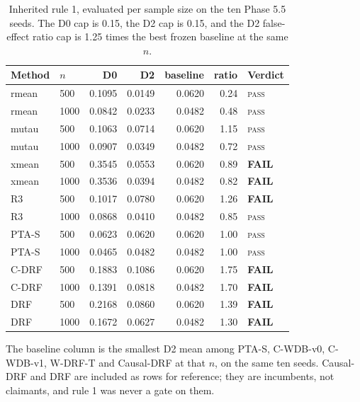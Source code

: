 \begin{table}[htbp]
\centering
\caption{Inherited rule 1, evaluated per sample size on the ten Phase 5.5 seeds. The D0 cap is 0.15, the D2 cap is 0.15, and the D2 false-effect ratio cap is 1.25 times the best frozen baseline at the same $n$.}
\label{tab:p55-rule1}
\small
\begin{tabular}{@{}llrrrrl@{}}
\toprule
Method & $n$ & D0 & D2 & baseline & ratio & Verdict \\
\midrule
rmean & 500 & 0.1095 & 0.0149 & 0.0620 & 0.24 & \textsc{pass} \\
rmean & 1000 & 0.0842 & 0.0233 & 0.0482 & 0.48 & \textsc{pass} \\
\addlinespace
mutau & 500 & 0.1063 & 0.0714 & 0.0620 & 1.15 & \textsc{pass} \\
mutau & 1000 & 0.0907 & 0.0349 & 0.0482 & 0.72 & \textsc{pass} \\
\addlinespace
xmean & 500 & 0.3545 & 0.0553 & 0.0620 & 0.89 & \textbf{FAIL} \\
xmean & 1000 & 0.3536 & 0.0394 & 0.0482 & 0.82 & \textbf{FAIL} \\
\addlinespace
R3 & 500 & 0.1017 & 0.0780 & 0.0620 & 1.26 & \textbf{FAIL} \\
R3 & 1000 & 0.0868 & 0.0410 & 0.0482 & 0.85 & \textsc{pass} \\
\addlinespace
PTA-S & 500 & 0.0623 & 0.0620 & 0.0620 & 1.00 & \textsc{pass} \\
PTA-S & 1000 & 0.0465 & 0.0482 & 0.0482 & 1.00 & \textsc{pass} \\
\addlinespace
C-DRF & 500 & 0.1883 & 0.1086 & 0.0620 & 1.75 & \textbf{FAIL} \\
C-DRF & 1000 & 0.1391 & 0.0818 & 0.0482 & 1.70 & \textbf{FAIL} \\
\addlinespace
DRF & 500 & 0.2168 & 0.0860 & 0.0620 & 1.39 & \textbf{FAIL} \\
DRF & 1000 & 0.1672 & 0.0627 & 0.0482 & 1.30 & \textbf{FAIL} \\
\bottomrule
\end{tabular}
\par\vspace{2pt}\parbox{0.9\textwidth}{\scriptsize The baseline column is the smallest D2 mean among PTA-S, C-WDB-v0, C-WDB-v1, W-DRF-T and Causal-DRF at that $n$, on the same ten seeds. Causal-DRF and DRF are included as rows for reference; they are incumbents, not claimants, and rule 1 was never a gate on them.}
\end{table}


